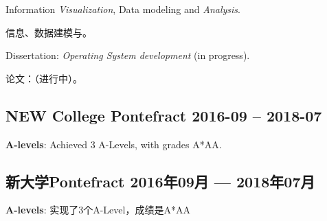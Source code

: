 \documentclass[cv.tex]{subfiles}
\begin{document}
\begin{itemize}
\begin{xcn}
\end{xcn}
\begin{xen}
            \item Information \emph{Visualization}, Data modeling and
                \emph{Analysis}.
\end{xen}
\begin{xcn}
            \item 信息、数据建模与。
\end{xcn}
\begin{xen}
            \item Dissertation: \emph{Operating System development} (in
                progress).
\end{xen}
\begin{xcn}
            \item 论文：（进行中）。
\end{xcn}
        \end{itemize}
\begin{xen}
    \subsection{NEW College Pontefract
        \hfill 2016-09 -- 2018-07}
        \textbf{A-levels}: Achieved 3 A-Levels, with grades A*AA.
\end{xen}
\begin{xcn}
        \subsection{新大学Pontefract
            \hfill 2016年09月 --- 2018年07月}
            \textbf{A-levels}: 实现了3个A-Level，成绩是A*AA
\end{xcn}
\end{document}
